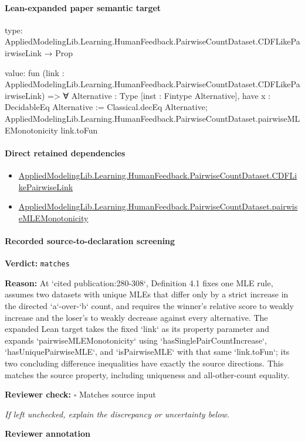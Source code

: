 \documentclass[10pt]{article}
\newcommand{\reviewerbox}{%
  \par\noindent\fbox{\parbox{0.96\linewidth}{\rule{0pt}{0.38in}}}\par
}
\newcommand{\reviewmatch}[1]{%
  \par\noindent\textbf{Reviewer check:} $\square$\; #1\par
  \noindent\emph{If left unchecked, explain the discrepancy or uncertainty below.}\par
}
\begin{document}
\paragraph{Lean-expanded paper semantic target}
\begin{ReviewVerbatim}
type:
AppliedModelingLib.Learning.HumanFeedback.PairwiseCountDataset.CDFLikePairwiseLink → Prop

value:
fun (link : AppliedModelingLib.Learning.HumanFeedback.PairwiseCountDataset.CDFLikePairwiseLink) =>
  ∀ {Alternative : Type} [inst : Fintype Alternative],
    have x : DecidableEq Alternative := Classical.decEq Alternative;
    AppliedModelingLib.Learning.HumanFeedback.PairwiseCountDataset.pairwiseMLEMonotonicity link.toFun
\end{ReviewVerbatim}

\paragraph{Direct retained dependencies}
\begin{itemize}\raggedright
\item \hyperlink{governing-declaration-3449f3559185d0fd}{Applied\allowbreak{}Modeling\allowbreak{}Lib.\allowbreak{}Learning.\allowbreak{}Human\allowbreak{}Feedback.\allowbreak{}Pairwise\allowbreak{}Count\allowbreak{}Dataset.\allowbreak{}CDF\allowbreak{}Like\allowbreak{}Pairwise\allowbreak{}Link}
\item \hyperlink{governing-declaration-1e123d0abe44df57}{Applied\allowbreak{}Modeling\allowbreak{}Lib.\allowbreak{}Learning.\allowbreak{}Human\allowbreak{}Feedback.\allowbreak{}Pairwise\allowbreak{}Count\allowbreak{}Dataset.\allowbreak{}pairwise\allowbreak{}MLE\allowbreak{}Monotonicity}
\end{itemize}
\paragraph{Recorded source-to-declaration screening}
\textbf{Verdict:} \texttt{matches}
\\
{\raggedright
\textbf{Reason:} At `cited publication:\allowbreak{}280-\allowbreak{}308`, Definition 4.\allowbreak{}1 fixes one MLE rule, assumes two datasets with unique MLEs that differ only by a strict increase in the directed `a`-\allowbreak{}over-\allowbreak{}`b` count, and requires the winner's relative score to weakly increase and the loser's to weakly decrease against every alternative.\allowbreak{} The expanded Lean target takes the fixed `link` as its property parameter and expands `pairwiseMLEMonotonicity` using `hasSinglePairCountIncrease`, `hasUniquePairwiseMLE`, and `isPairwiseMLE` with that same `link.\allowbreak{}toFun`;\allowbreak{} its two concluding difference inequalities have exactly the source directions.\allowbreak{} This matches the source property, including uniqueness and all-\allowbreak{}other-\allowbreak{}count equality.\allowbreak{}
\par}
\reviewmatch{Matches source input}
\noindent\textbf{Reviewer annotation}\par
\reviewerbox
\clearpage
\hypertarget{paper-prerequisite-0eba3734667d4efb}{}
\end{document}
